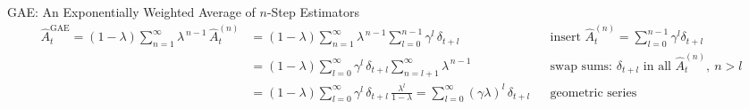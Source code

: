 \begin{frame}{GAE: An Exponentially Weighted Average of $n$-Step Estimators}
  \small
  \vspace{-0.3em}
  \begin{align*}
    \hat{A}_t^{\text{GAE}} = (1-\lambda)\sum_{n=1}^{\infty}\lambda^{\,n-1}\,\hat{A}_t^{(n)}
    &= (1-\lambda)\sum_{n=1}^{\infty}\lambda^{\,n-1}\sum_{l=0}^{n-1}\gamma^l\,\delta_{t+l}
      && \text{insert } \hat{A}_t^{(n)} = \textstyle\sum_{l=0}^{n-1}\gamma^l\delta_{t+l} \\
    &= (1-\lambda)\sum_{l=0}^{\infty}\gamma^l\,\delta_{t+l}\sum_{n=l+1}^{\infty}\lambda^{\,n-1}
      && \text{swap sums: } \delta_{t+l} \text{ in all } \hat{A}_t^{(n)},\ n > l \\
    &= (1-\lambda)\sum_{l=0}^{\infty}\gamma^l\,\delta_{t+l}\,\frac{\lambda^{l}}{1-\lambda}
     = \sum_{l=0}^{\infty}(\gamma\lambda)^l\,\delta_{t+l}
      && \text{geometric series}
  \end{align*}
  \vspace{-0.9em}
  \begin{columns}[T]
    \begin{column}{0.58\textwidth}
      \begin{center}
\end{center}
\end{column}
\end{columns}
\end{frame}
